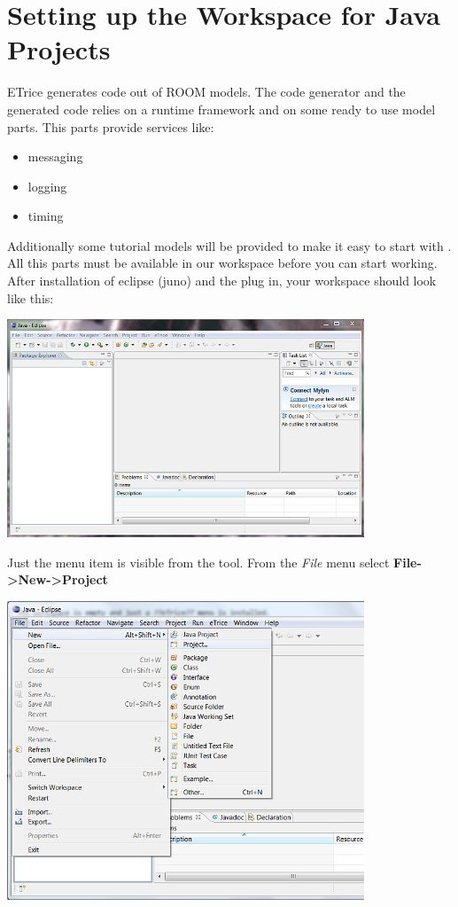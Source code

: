 \chapter{Setting up the Workspace for Java Projects}

ETrice generates code out of ROOM models. The code generator and the generated code relies on a runtime 
framework and on some ready to use model parts. This parts provide services like:

\begin{itemize}
\item messaging
\item logging
\item timing
\end{itemize}

Additionally some tutorial models will be provided to make it easy to start with \eTrice{}. All this parts 
must be available in our workspace before you can start working. After installation of eclipse (juno) and 
the \eTrice{} plug in, your workspace should look like this:  

\includegraphics[width=0.8\textwidth]{images/013-SetupWorkspace01.png}

Just the \textit{\eTrice{}} menu item is visible from the \eTrice{} tool.
From the \textit{File} menu select \textbf{File->New->Project}

\includegraphics[width=0.8\textwidth]{images/013-SetupWorkspace02.png}

